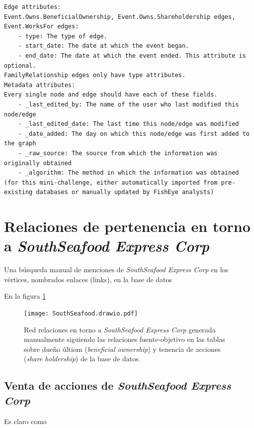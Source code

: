 \documentclass[11pt,spanish,a4paper]{article}
\begin{document}
\begin{verbatim}
Edge attributes:
Event.Owns.BeneficialOwnership, Event.Owns.Shareholdership edges, Event.WorksFor edges:
    - type: The type of edge.
    - start_date: The date at which the event began.
    - end_date: The date at which the event ended. This attribute is optional.
FamilyRelationship edges only have type attributes.
Metadata attributes:
Every single node and edge should have each of these fields. 
    - _last_edited_by: The name of the user who last modified this node/edge
    - _last_edited_date: The last time this node/edge was modified
    - _date_added: The day on which this node/edge was first added to the graph
    - _raw_source: The source from which the information was originally obtained
    - _algorithm: The method in which the information was obtained (for this mini-challenge, either automatically imported from pre-existing databases or manually updated by FishEye analysts)
\end{verbatim}


\section{Relaciones de pertenencia en torno a \emph{SouthSeafood Express Corp}}

Una búsqueda manual de menciones de \emph{SouthSeafood Express Corp} en los vértices, nombrados enlaces (links), en la base de datos


En la figura \ref{fig:drawio} 

\begin{figure}[!ht]
	\centering
	\texttt{[image: SouthSeafood.drawio.pdf]}
	\caption{Red relaciones en torno a \emph{SouthSeafood Express Corp} generada manualmente siguiendo las relaciones fuente-objetivo en las tablas sobre dueño últiom (\emph{beneficial ownership}) y tenencia de acciones (\emph{share holdership}) de la base de datos.}
	\label{fig:drawio}
\end{figure}



\subsection{Venta de acciones de \emph{SouthSeafood Express Corp}}

Es claro como 
\end{document}
